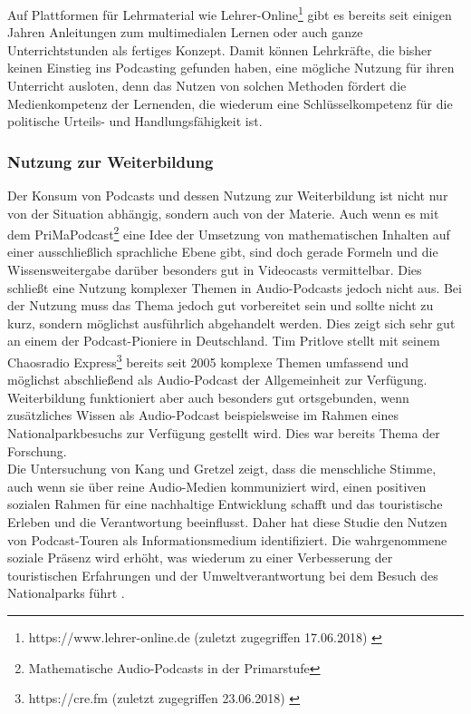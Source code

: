 \documentclass[11pt,a4paper]{scrreprt}
\begin{document}
Auf Plattformen für Lehrmaterial wie Lehrer-Online\footnote{https://www.lehrer-online.de (zuletzt zugegriffen 17.06.2018) \cite{EduversumGmbH1999}} gibt es bereits seit einigen Jahren Anleitungen zum multimedialen Lernen oder auch ganze Unterrichtstunden als fertiges Konzept. Damit können Lehrkräfte, die bisher keinen Einstieg ins Podcasting gefunden haben, eine mögliche Nutzung für ihren Unterricht ausloten, denn das Nutzen von solchen Methoden fördert die Medienkompetenz der Lernenden, die wiederum eine Schlüsselkompetenz für die politische Urteils- und Handlungsfähigkeit ist. 

\subsubsection{Nutzung zur Weiterbildung}
Der Konsum von Podcasts und dessen Nutzung zur Weiterbildung ist nicht nur von der Situation abhängig, sondern auch von der Materie. Auch wenn es mit dem PriMaPodcast\footnote{Mathematische Audio-Podcasts in der Primarstufe} eine Idee der Umsetzung von mathematischen Inhalten auf einer ausschließlich sprachliche Ebene gibt, sind doch gerade Formeln und die Wissensweitergabe darüber besonders gut in Videocasts vermittelbar. Dies schließt eine Nutzung komplexer Themen in Audio-Podcasts jedoch nicht aus. Bei der Nutzung muss das Thema jedoch gut vorbereitet sein und sollte nicht zu kurz, sondern möglichst ausführlich abgehandelt werden. Dies zeigt sich sehr gut an einem der Podcast-Pioniere in Deutschland. Tim Pritlove stellt mit seinem Chaosradio Express\footnote{https://cre.fm (zuletzt zugegriffen 23.06.2018) \cite{TPPM2005}} bereits seit 2005 komplexe Themen umfassend und möglichst abschließend als Audio-Podcast der Allgemeinheit zur Verfügung.\\
Weiterbildung funktioniert aber auch besonders gut ortsgebunden, wenn zusätzliches Wissen als Audio-Podcast beispielsweise im Rahmen eines Nationalparkbesuchs zur Verfügung gestellt wird. Dies war bereits Thema der Forschung.\\
Die Untersuchung von Kang und Gretzel zeigt, dass die menschliche Stimme, auch wenn sie über reine Audio-Medien kommuniziert wird, einen positiven sozialen Rahmen für eine nachhaltige Entwicklung schafft und das touristische Erleben und die Verantwortung beeinflusst. Daher hat diese Studie den Nutzen von Podcast-Touren als Informationsmedium identifiziert. Die wahrgenommene soziale Präsenz wird erhöht, was wiederum zu einer Verbesserung der touristischen Erfahrungen und der Umweltverantwortung bei dem Besuch des Nationalparks führt \cite{Kang2012}.
\end{document}

